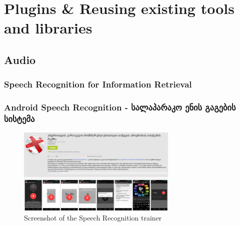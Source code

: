 \documentclass{beamer}
\begin{document}
\section[Plugins]{Plugins \& Reusing existing tools and libraries}

\subsection{Audio}
%
%
%
%


\subsubsection[ASR]{Speech Recognition for Information Retrieval}

\begin{frame}
\frametitle{Android Speech Recognition - სალაპარაკო ენის გაგების სისტემა}

\begin{figure}
\begin{center}
\includegraphics[width=3in]{../figures/kartuli_speech_recognition}
\caption{Screenshot of the Speech Recognition trainer}
\label{speech_recognition_screenshot}
\end{center}
\end{figure}

\end{frame}
\end{document}
